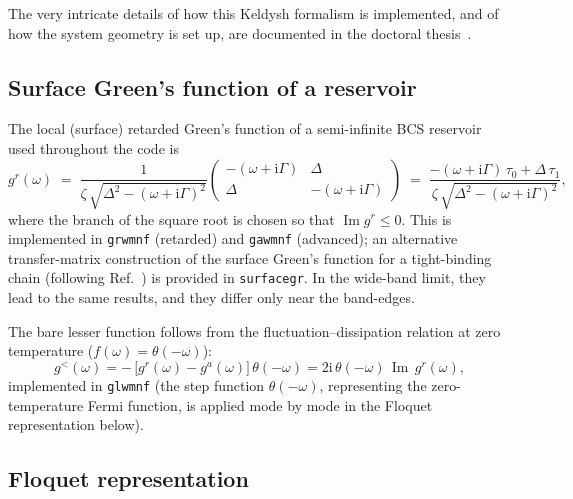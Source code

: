 \documentclass[11pt,a4paper]{article}
\newcommand{\ii}{\mathrm{i}}
\newcommand{\Imag}{\operatorname{Im}}
\begin{document}
The very intricate details of how this Keldysh formalism is implemented, and of
how the system geometry is set up, are documented in the doctoral
thesis~\cite{LahiriThesis2026}.

\subsection{Surface Green's function of a reservoir}
\label{sec:surface}

The local (surface) retarded Green's function of a semi-infinite BCS reservoir used
throughout the code is
\begin{equation}
  g^r(\omega) \;=\;
  \frac{1}{\zeta\,\sqrt{\Delta^2-(\omega+\ii\Gamma)^2}}
  \begin{pmatrix}
    -(\omega+\ii\Gamma) & \Delta\\[2pt]
    \Delta & -(\omega+\ii\Gamma)
  \end{pmatrix}
  \;=\;
  \frac{-(\omega+\ii\Gamma)\,\tau_0+\Delta\,\tau_1}
       {\zeta\,\sqrt{\Delta^2-(\omega+\ii\Gamma)^2}} ,
  \label{eq:surface_gf}
\end{equation}
where the branch of the square root is chosen so that $\Imag g^r\le 0$.  This is
implemented in \texttt{grwmnf} (retarded) and \texttt{gawmnf} (advanced); an
alternative transfer-matrix construction of the surface Green's function
for a tight-binding chain (following Ref.~\cite{surfaceGF2011})
is provided in \texttt{surfacegr}. In the wide-band limit, they lead to the same results, 
and they differ only near the band-edges.

The bare lesser function follows from the fluctuation--dissipation relation at
zero temperature ($f(\omega)=\theta(-\omega)$):
\begin{equation}
  g^<(\omega) = -\,\bigl[g^r(\omega)-g^a(\omega)\bigr]\,\theta(-\omega)
              = 2\ii\,\theta(-\omega)\,\Imag\, g^r(\omega) ,
  \label{eq:bare_lesser}
\end{equation}
implemented in \texttt{glwmnf} (the step function $\theta(-\omega)$, representing the 
zero-temperature Fermi function, is applied mode by mode in the Floquet representation below).

\subsection{Floquet representation}
\label{sec:floquet}
\end{document}
